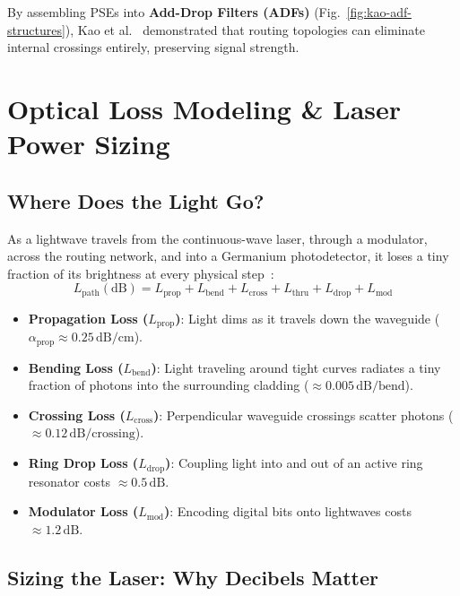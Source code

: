 By assembling PSEs into \textbf{Add-Drop Filters (ADFs)} (Fig.~\ref{fig:kao-adf-structures}), Kao et al.~\cite{Kao2026} demonstrated that routing topologies can eliminate internal crossings entirely, preserving signal strength.

\section{Optical Loss Modeling \& Laser Power Sizing}
\label{sec:optical-loss-budget}

\subsection{Where Does the Light Go?}

As a lightwave travels from the continuous-wave laser, through a modulator, across the routing network, and into a Germanium photodetector, it loses a tiny fraction of its brightness at every physical step~\cite{Vantrease2008,Ye2013,Kao2026}:
\begin{equation}
    L_{\mathrm{path}}(\mathrm{dB}) = L_{\mathrm{prop}} + L_{\mathrm{bend}} + L_{\mathrm{cross}} + L_{\mathrm{thru}} + L_{\mathrm{drop}} + L_{\mathrm{mod}}
    \label{eq:optical-loss-sum}
\end{equation}
\begin{itemize}
    \item \textbf{Propagation Loss ($L_{\mathrm{prop}}$)}: Light dims as it travels down the waveguide ($\alpha_{\mathrm{prop}} \approx 0.25\,\mathrm{dB/cm}$).
    \item \textbf{Bending Loss ($L_{\mathrm{bend}}$)}: Light traveling around tight curves radiates a tiny fraction of photons into the surrounding cladding ($\approx 0.005\,\mathrm{dB/bend}$).
    \item \textbf{Crossing Loss ($L_{\mathrm{cross}}$)}: Perpendicular waveguide crossings scatter photons ($\approx 0.12\,\mathrm{dB/crossing}$).
    \item \textbf{Ring Drop Loss ($L_{\mathrm{drop}}$)}: Coupling light into and out of an active ring resonator costs $\approx 0.5\,\mathrm{dB}$.
    \item \textbf{Modulator Loss ($L_{\mathrm{mod}}$)}: Encoding digital bits onto lightwaves costs $\approx 1.2\,\mathrm{dB}$.
\end{itemize}

\subsection{Sizing the Laser: Why Decibels Matter}

